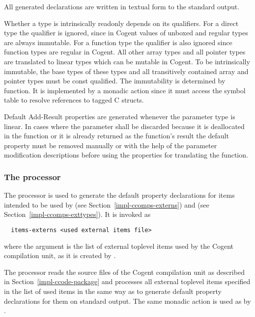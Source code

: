 All generated declarations are written in textual form to the standard output.

Whether a type is intrinsically readonly depends on its  qualifiers. For a direct type the 
qualifier is ignored, since in Cogent values of unboxed and regular types are always immutable. For
a function type the qualifier is also ignored since function types are regular in Cogent. All other array types 
and all pointer types are translated to linear types which can be mutable in
Cogent. To be intrinsically immutable, the base types of these types and all transitively contained array and pointer 
types must be const qualified. The immutability is determined by function. It is implemented
by a monadic action since it must access the symbol table to resolve references to tagged C structs.

Default Add-Result properties are generated whenever the parameter type is linear. In cases where the parameter 
shall be discarded because it is deallocated in the function or it is already returned as the function's result
the default property must be removed manually or with the help of the parameter modification descriptions before
using the properties for translating the function.

\subsubsection{The processor }

The processor  is used to generate the default property declarations for items intended
to be used by  (see Section~\ref{impl-ccomps-externs}) and  
(see Section~\ref{impl-ccomps-exttypes}). It is invoked as
\begin{verbatim}
  items-externs <used external items file>
\end{verbatim}
where the argument is the list of external toplevel items used by the Cogent compilation unit, as it is created 
by .

The processor reads the source files of the Cogent compilation unit as described in Section~\ref{impl-ccode-package}
and processes all external toplevel items specified in the list of used items in the same way as 
to generate default property declarations for them on standard output. The same monadic action 
is used as by .


